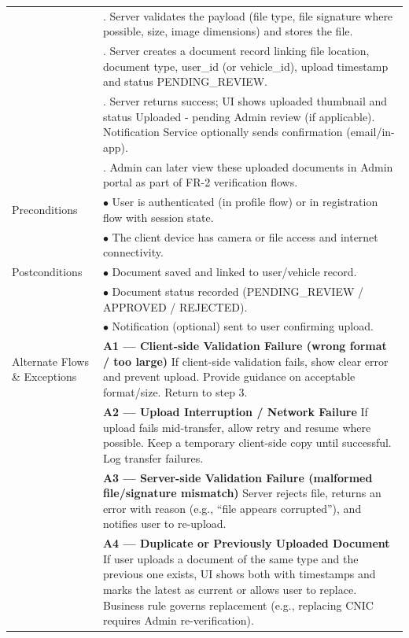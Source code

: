 \begin{longtable}{|>{\raggedright\arraybackslash}p{4cm}|>{\raggedright\arraybackslash}p{11cm}|}
& 6. Server validates the payload (file type, file signature where possible, size, image dimensions) and stores the file. \\
& 7. Server creates a document record linking file location, document type, user\_id (or vehicle\_id), upload timestamp and status PENDING\_REVIEW. \\
& 8. Server returns success; UI shows uploaded thumbnail and status Uploaded - pending Admin review (if applicable). Notification Service optionally sends confirmation (email/in-app). \\
& 9. Admin can later view these uploaded documents in Admin portal as part of FR-2 verification flows. \\
\hline
Preconditions & $\bullet$ User is authenticated (in profile flow) or in registration flow with session state. \\
& $\bullet$ The client device has camera or file access and internet connectivity. \\
\hline
Postconditions & $\bullet$ Document saved and linked to user/vehicle record. \\
& $\bullet$ Document status recorded (PENDING\_REVIEW / APPROVED / REJECTED). \\
& $\bullet$ Notification (optional) sent to user confirming upload. \\
\hline
Alternate Flows \& Exceptions & \textbf{A1 — Client-side Validation Failure (wrong format / too large)} \newline If client-side validation fails, show clear error and prevent upload. Provide guidance on acceptable format/size. Return to step 3. \\
& \textbf{A2 — Upload Interruption / Network Failure} \newline If upload fails mid-transfer, allow retry and resume where possible. Keep a temporary client-side copy until successful. Log transfer failures. \\
& \textbf{A3 — Server-side Validation Failure (malformed file/signature mismatch)} \newline Server rejects file, returns an error with reason (e.g., ``file appears corrupted''), and notifies user to re-upload. \\
& \textbf{A4 — Duplicate or Previously Uploaded Document} \newline If user uploads a document of the same type and the previous one exists, UI shows both with timestamps and marks the latest as current or allows user to replace. Business rule governs replacement (e.g., replacing CNIC requires Admin re-verification). \\

\end{longtable}
